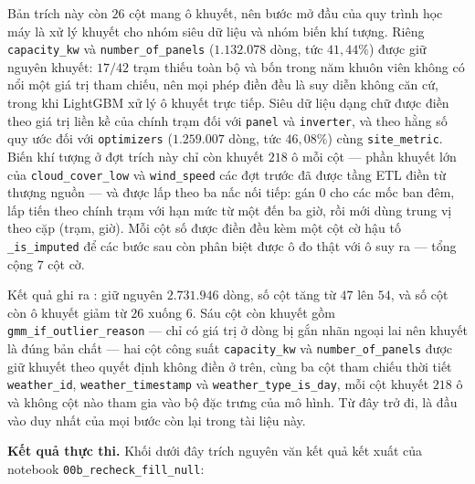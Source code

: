 Bản trích này còn $26$ cột mang ô khuyết, nên bước mở đầu của quy trình học máy là xử lý
khuyết cho nhóm siêu dữ liệu và nhóm biến khí tượng. Riêng \texttt{capacity\_kw} và
\texttt{number\_of\_panels} ($1.132.078$ dòng, tức $41{,}44\%$) được giữ nguyên khuyết:
$17/42$ trạm thiếu toàn bộ và bốn trong năm khuôn viên không có nổi một giá trị tham chiếu,
nên mọi phép điền đều là suy diễn không căn cứ, trong khi LightGBM xử lý ô khuyết trực tiếp.
Siêu dữ liệu dạng chữ được điền theo giá trị liền kề của chính trạm đối với
\texttt{panel} và \texttt{inverter}, và theo hằng số quy ước đối với \texttt{optimizers}
($1.259.007$ dòng, tức $46{,}08\%$) cùng \texttt{site\_metric}. Biến khí tượng ở đợt trích
này chỉ còn khuyết $218$ ô mỗi cột --- phần khuyết lớn của \texttt{cloud\_cover\_low} và
\texttt{wind\_speed} các đợt trước đã được tầng ETL điền từ thượng nguồn --- và được lấp
theo ba nấc nối tiếp: gán $0$ cho các mốc ban đêm, lấp tiến theo chính trạm với hạn mức
từ một đến ba giờ, rồi mới dùng trung vị theo cặp (trạm, giờ). Mỗi cột số
được điền đều kèm một cột cờ hậu tố \texttt{\_is\_imputed} để các bước sau còn phân biệt
được ô đo thật với ô suy ra --- tổng cộng $7$ cột cờ.

Kết quả ghi ra : giữ nguyên
$2.731.946$ dòng, số cột tăng từ $47$ lên $54$, và số cột còn ô khuyết giảm từ $26$ xuống
$6$. Sáu cột còn khuyết gồm \texttt{gmm\_if\_outlier\_reason} --- chỉ có giá trị ở dòng bị
gắn nhãn ngoại lai nên khuyết là đúng bản chất --- hai cột công suất
\texttt{capacity\_kw} và \texttt{number\_of\_panels} được giữ khuyết theo quyết định không
điền ở trên, cùng ba cột tham chiếu thời tiết
\texttt{weather\_id}, \texttt{weather\_timestamp} và \texttt{weather\_type\_is\_day}, mỗi
cột khuyết $218$ ô và không cột nào tham gia vào bộ đặc trưng của mô hình. Từ đây trở đi,
 là đầu vào duy nhất của mọi bước còn lại trong tài liệu này.

\textbf{Kết quả thực thi.} Khối dưới đây trích nguyên văn kết quả kết xuất của notebook
\texttt{00b\_recheck\_fill\_null}:

